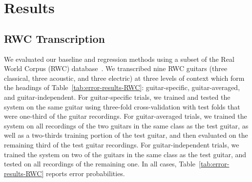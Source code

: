 \documentclass[convention,peer-reviewed]{aesconf}
\begin{document}
\section{Results}  
\subsection{RWC Transcription}
We evaluated our baseline and regression methods using a subset of the Real World Corpus (RWC) database~\cite{goto2003}. We transcribed nine RWC guitars (three classical, three acoustic, and three electric) at three levels of context which form the headings of Table~\ref{tab:error-results-RWC}: guitar-specific, guitar-averaged, and guitar-independent. For guitar-specific trials, we trained and tested the system on the same guitar using three-fold cross-validation with test folds that were one-third of the guitar recordings. For guitar-averaged trials, we trained the system on all recordings of the two guitars in the same class as the test guitar, as well as a two-thirds training portion of the test guitar, and then evaluated on the remaining third of the test guitar recordings. For guitar-independent trials, we trained the system on two of the guitars in the same class as the test guitar, and tested on all recordings of the remaining one. In all cases, Table~\ref{tab:error-results-RWC} reports error probabilities.
\end{document}
